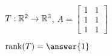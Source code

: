\documentclass{ximera}
\author{Zack Reed}
\begin{document}
\begin{problem}\label{prob:imagerankoflintrans2}
    $T:\mathbb{R}^2\rightarrow\mathbb{R}^3$, $A=\begin{bmatrix}1&1\\1&1\\1&1\end{bmatrix}$
      
    \begin{multipleChoice}
    \end{multipleChoice}
      
    $\mbox{rank}(T)=\answer{1}$
    \end{problem}
    
     
     
     
\end{document}
